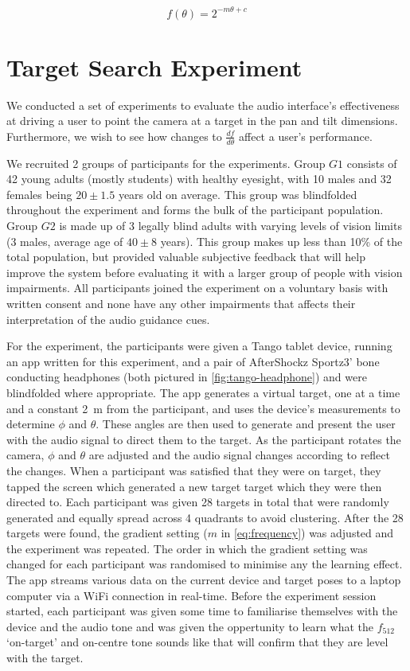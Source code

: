 \documentclass[sigconf, screen=true, anonymous=true]{acmart}
\begin{document}
\begin{equation}\label{eq:frequency}
  f(\theta) = 2^{-m\theta + c}
\end{equation}

\section{Target Search Experiment}\label{sec:experiments}

We conducted a set of experiments to evaluate the audio interface's effectiveness at driving a user to point the camera at a target in the pan and tilt dimensions.
Furthermore, we wish to see how changes to $\frac{df}{d\theta}$ affect a user's performance.

We recruited 2 groups of participants for the experiments.
Group $G1$ consists of 42 young adults (mostly students) with healthy eyesight, with 10 males and 32 females being $20\pm1.5$ years old on average.
This group was blindfolded throughout the experiment and forms the bulk of the participant population.
Group $G2$ is made up of 3 legally blind adults with varying levels of vision limits (3 males, average age of $40\pm8$ years). 
This group makes up less than 10\% of the total population, but provided valuable subjective feedback that will help improve the system before evaluating it with a larger group of people with vision impairments. 
All participants joined the experiment on a voluntary basis with written consent and none have any other impairments that affects their interpretation of the audio guidance cues.

For the experiment, the participants were given a Tango tablet device, running an app written for this experiment, and a pair of AfterShockz Sportz3' bone conducting headphones (both pictured in \cref{fig:tango-headphone}) and were blindfolded where appropriate.
The app generates a virtual target, one at a time and a constant \SI{2}{\metre} from the participant, and uses the device's measurements to determine $\phi$ and $\theta$.
These angles are then used to generate and present the user with the audio signal to direct them to the target. 
As the participant rotates the camera, $\phi$ and $\theta$ are adjusted and the audio signal changes according to reflect the changes.
When a participant was satisfied that they were on target, they tapped the screen which generated a new target target which they were then directed to. 
Each participant was given 28 targets in total that were randomly generated and equally spread across 4 quadrants to avoid clustering. 
After the 28 targets were found, the gradient setting ($m$ in \cref{eq:frequency}) was adjusted and the experiment was repeated. 
The order in which the gradient setting was changed for each participant was randomised to minimise any the learning effect.
The app streams various data on the current device and target poses to a laptop computer via a WiFi connection in real-time. 
Before the experiment session started, each participant was given some time to familiarise themselves with the device and the audio tone and was given the oppertunity to learn what the $f_{512}$ `on-target' and on-centre tone sounds like that will confirm that they are level with the target.
\end{document}
